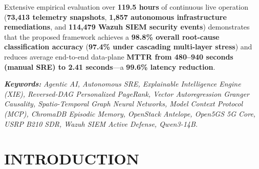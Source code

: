 Extensive empirical evaluation over \textbf{119.5 hours} of continuous live operation (\textbf{73,413 telemetry snapshots}, \textbf{1,857 autonomous infrastructure remediations}, and \textbf{114,479 Wazuh SIEM security events}) demonstrates that the proposed framework achieves a \textbf{98.8\% overall root-cause classification accuracy} (\textbf{97.4\% under cascading multi-layer stress}) and reduces average end-to-end data-plane \textbf{MTTR from 480--940 seconds (manual SRE) to 2.41 seconds}---a \textbf{99.6\% latency reduction}.

\vspace{0.5cm}
\noindent\textbf{\textit{Keywords:}} \textit{Agentic AI, Autonomous SRE, Explainable Intelligence Engine (XIE), Reversed-DAG Personalized PageRank, Vector Autoregression Granger Causality, Spatio-Temporal Graph Neural Networks, Model Context Protocol (MCP), ChromaDB Episodic Memory, OpenStack Antelope, Open5GS 5G Core, USRP B210 SDR, Wazuh SIEM Active Defense, Qwen3-14B.}

\newpage

\tableofcontents
\newpage

\listoftables
\newpage

\listoffigures
\newpage

\setcounter{page}{1}

\chapter{INTRODUCTION}

